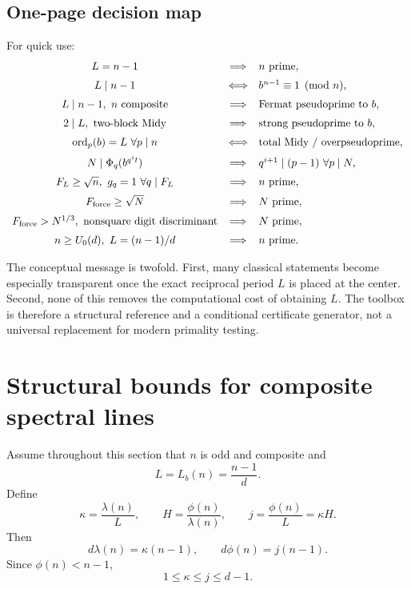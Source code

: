 \documentclass[11pt]{article}
\newcommand{\ord}{\operatorname{ord}}
\begin{document}
\subsection{One-page decision map}

For quick use:
\[
\begin{array}{ccl}
L=n-1
&\Longrightarrow& n\text{ prime},\\[2mm]
L\mid n-1
&\Longleftrightarrow& b^{n-1}\equiv1\pmod n,\\[2mm]
L\mid n-1,\ n\text{ composite}
&\Longrightarrow& \text{Fermat pseudoprime to }b,\\[2mm]
2\mid L,\ \text{two-block Midy}
&\Longrightarrow& \text{strong pseudoprime to }b,\\[2mm]
\ord_p(b)=L\ \forall p\mid n
&\Longleftrightarrow& \text{total Midy / overpseudoprime},\\[2mm]
N\mid\Phi_q(b^{q^it})
&\Longrightarrow& q^{i+1}\mid(p-1)\ \forall p\mid N,\\[2mm]
F_L\ge\sqrt n,\ g_q=1\ \forall q\mid F_L
&\Longrightarrow& n\text{ prime},\\[2mm]
F_{\rm force}\ge\sqrt N
&\Longrightarrow& N\text{ prime},\\[2mm]
F_{\rm force}>N^{1/3},\ \text{nonsquare digit discriminant}
&\Longrightarrow& N\text{ prime},\\[2mm]
n\ge U_0(d),\ L=(n-1)/d
&\Longrightarrow& n\text{ prime}.
\end{array}
\]

The conceptual message is twofold.  First, many classical statements become
especially transparent once the exact reciprocal period $L$ is placed at the
center.  Second, none of this removes the computational cost of obtaining
$L$.  The toolbox is therefore a structural reference and a conditional
certificate generator, not a universal replacement for modern primality
testing.



\section{Structural bounds for composite spectral lines}

Assume throughout this section that $n$ is odd and composite and
\[
L=L_b(n)=\frac{n-1}{d}.
\]
Define
\begin{equation}
\kappa=\frac{\lambda(n)}L,
\qquad
H=\frac{\phi(n)}{\lambda(n)},
\qquad
j=\frac{\phi(n)}L=\kappa H.
\label{eq:dHj}
\end{equation}
Then
\[
d\lambda(n)=\kappa(n-1),
\qquad
d\phi(n)=j(n-1).
\]
Since $\phi(n)<n-1$,
\begin{equation}
1\le \kappa\le j\le d-1.
\label{eq:djrange}
\end{equation}
\end{document}
